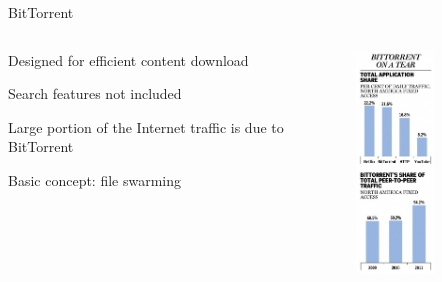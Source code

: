 \begin{frame}{BitTorrent}

\begin{columns}
\begin{column}{0.65\textwidth}

\BI
\item Designed for efficient content download 
\item Search features not included 
\item Large portion of the Internet traffic is due to BitTorrent
\item Basic concept: file swarming
\EI	
	
\begin{Bib}
{\scriptsize
{}
}
\end{Bib}	
\end{column}
\hfill
\begin{column}{0.3\textwidth}
	\includegraphics[width=0.5\textwidth]{figs/10/p2p-stats1.jpg}

\end{column}
\end{columns}
\end{frame}
